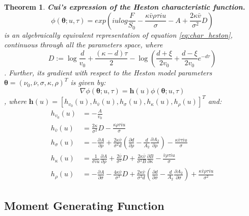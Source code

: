 \documentclass[12,twoside]{mammeTFM}
\newtheorem{thm}{Theorem}[section]
\theoremstyle{definition}
\theoremstyle{remark}
\begin{document}
\begin{thm} \textbf{Cui's expression of the Heston characteristic function.}
\begin{equation}
\phi(\boldsymbol{\theta}; u, \tau) = exp \left(i u log \dfrac{F}{S_{0}}-\dfrac{\kappa \bar{v} \rho \tau i u}{\sigma}-A + \dfrac{2 \kappa \bar{v}}{\sigma^{2}}D \right)
\end{equation}
is an algebraically equivalent representation of equation \ref{eq:char_heston}, continuous through all the parameters space, where
\begin{equation}
D := \log \frac{d}{v_{0}}+\frac{(\kappa-d) \tau}{2}-\log \left(\frac{d+\xi}{2 v_{0}}+\frac{d-\xi}{2 v_{0}} e^{-d \tau}\right)
\end{equation}
. Further, its gradient with respect to the Heston model parameters $\boldsymbol{\theta} = (\nu_0, \overline{\nu}, \sigma, \kappa, \rho)^{T}$ is given by:
\begin{equation}
\nabla \phi(\boldsymbol{\theta}; u, \tau) = \boldsymbol{h}(u) \phi(\boldsymbol{\theta}; u, \tau)
\end{equation}
, where $\boldsymbol{h}(u) = [h_{v_0}(u), h_{\overline{v}}(u), h_\sigma(u), h_\kappa(u), h_\rho(u)]^T$ and:
\begin{align}
h_{v_0}(u)& =-\frac{A}{v_{0}} \\
h_{\overline{v}}(u)& =\frac{2 \kappa}{\sigma^{2}} D-\frac{\kappa \rho \tau i u}{\sigma} \\
h_{\sigma}(u)& =-\frac{\partial A}{\partial \rho}+\frac{2 \kappa \bar{v}}{\sigma^{2} d}\left(\frac{\partial d}{\partial \rho}-\frac{d}{A_{2}} \frac{\partial A_{2}}{\partial \rho}\right)-\frac{\kappa \bar{v} \tau i u}{\sigma} \\
h_{\kappa}(u)& =\frac{1}{\sigma i u} \frac{\partial A}{\partial \rho}+\frac{2 \bar{v}}{\sigma^{2}} D+\frac{2 \kappa \bar{v}}{\sigma^{2} B} \frac{\partial B}{\partial \kappa}-\frac{\bar{v} \rho \tau i u}{\sigma} \\
h_{\rho}(u)& =-\frac{\partial A}{\partial \sigma}-\frac{4 \kappa \bar{v}}{\sigma^{3}} D+\frac{2 \kappa \bar{v}}{\sigma^{2} d}\left(\frac{\partial d}{\partial \sigma}-\frac{d}{A_{2}} \frac{\partial A_{2}}{\partial \sigma}\right)+\frac{\kappa \bar{v} \rho \tau i u}{\sigma^{2}}
\end{align}

\end{thm}

\subsection{Moment Generating Function} \label{subsec:heston_moment}
\end{document}
